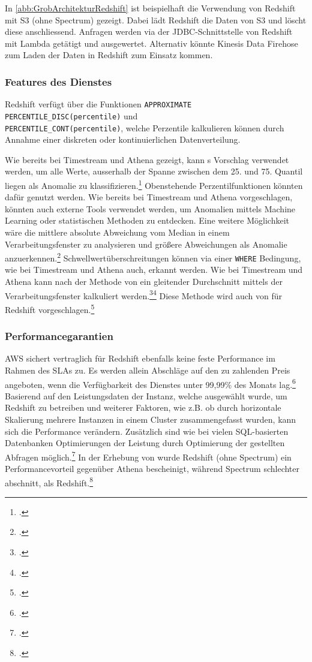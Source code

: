 In \autoref{abb:GrobArchitekturRedshift} ist beispielhaft die Verwendung von Redshift mit \ac{S3} (ohne Spectrum) gezeigt. Dabei lädt Redshift die Daten von \ac{S3} und löscht diese anschliessend. Anfragen werden via der \ac{JDBC}-Schnittstelle von Redshift mit Lambda getätigt und ausgewertet. Alternativ könnte Kinesis Data Firehose zum Laden der Daten in Redshift zum Einsatz kommen.


\subsubsection{Features des Dienstes}
Redshift verfügt über die Funktionen \texttt{APPROXIMATE PERCENTILE_DISC(percentile)} und \\ \texttt{PERCENTILE_CONT(percentile)}, welche Perzentile kalkulieren können durch Annahme einer diskreten oder kontinuierlichen Datenverteilung.

Wie bereits bei Timestream und Athena gezeigt, kann \citeauthor{Salgado.2019}s Vorschlag verwendet werden, um alle Werte, ausserhalb der Spanne zwischen dem 25. und 75. Quantil liegen als Anomalie zu klassifizieren.\footcite[Vgl.][]{Salgado.2019} Obenstehende Perzentilfunktionen könnten dafür genutzt werden. Wie bereits bei Timestream und Athena vorgeschlagen, könnten auch externe Tools verwendet werden, um Anomalien mittels Machine Learning oder statistischen Methoden zu entdecken. Eine weitere Möglichkeit wäre die mittlere absolute Abweichung vom Median in einem Verarbeitungsfenster zu analysieren und größere Abweichungen als Anomalie anzuerkennen.\footcite[Vgl.][]{Peak.2017}
Schwellwertüberschreitungen können via einer \texttt{WHERE} Bedingung, wie bei Timestream und Athena auch, erkannt werden.
Wie bei Timestream und Athena kann nach der Methode von \citeauthor{Ross.2020} ein gleitender Durchschnitt mittels der Verarbeitungsfenster kalkuliert werden.\footcite[Vgl.][]{Ross.2020}\nzitat\footcite[Vgl.][]{Ubiq.o.J.} Diese Methode wird auch von \citeauthor{Ubiq.o.J.} für Redshift vorgeschlagen.\footcite[Vgl.][]{Ubiq.o.J.}

\subsubsection{Performancegarantien}
\ac{AWS} sichert vertraglich für Redshift ebenfalls keine feste Performance im Rahmen des \acp{SLA} zu. Es werden allein Abschläge auf den zu zahlenden Preis angeboten, wenn die Verfügbarkeit des Dienstes unter 99,99\% des Monats lag.\footcite[Vgl.][]{AmazonWebServicesInc..2019b} Basierend auf den Leistungsdaten der Instanz, welche ausgewählt wurde, um Redshift zu betreiben und weiterer Faktoren, wie z.B. ob durch horizontale Skalierung mehrere Instanzen in einem Cluster zusammengefasst wurden, kann sich die Performance verändern. Zusätzlich sind wie bei vielen \ac{SQL}-basierten Datenbanken Optimierungen der Leistung durch Optimierung der gestellten Abfragen möglich.\footcite[Vgl.][]{AmazonWebServicesInc..o.J.ab} In der Erhebung von \citeauthor{Tan.2019} wurde Redshift (ohne Spectrum) ein Performancevorteil gegenüber Athena bescheinigt, während Spectrum schlechter abschnitt, als Redshift.\footcite[Vgl.][2176]{Tan.2019}


